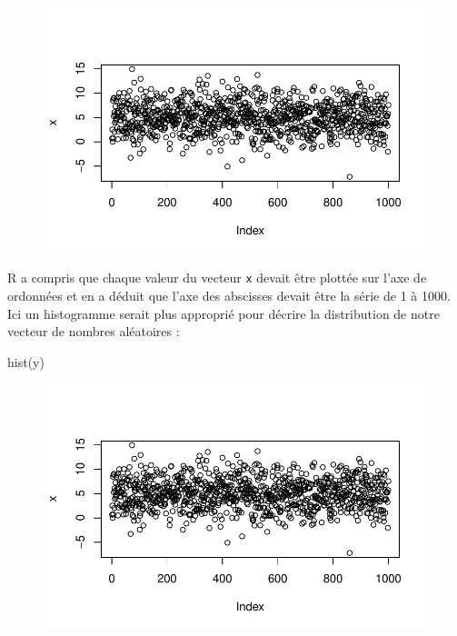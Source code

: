 \documentclass[
  letterpaper,
  DIV=11,
  numbers=noendperiod]{scrreprt}
\newenvironment{Shaded}{\begin{snugshade}}{\end{snugshade}}
\newcommand{\FunctionTok}[1]{\textcolor[rgb]{0.28,0.35,0.67}{#1}}
\newcommand{\NormalTok}[1]{\textcolor[rgb]{0.00,0.23,0.31}{#1}}
\begin{document}
\begin{figure}[H]

{\centering \includegraphics{premiers-pas_files/figure-pdf/unnamed-chunk-59-1.pdf}

}

\end{figure}

R a compris que chaque valeur du vecteur \texttt{x} devait être plottée
sur l'axe de ordonnées et en a déduit que l'axe des abscisses devait
être la série de 1 à 1000. Ici un histogramme serait plus approprié pour
décrire la distribution de notre vecteur de nombres aléatoires :

\begin{Shaded}
\begin{Highlighting}[]
\FunctionTok{hist}\NormalTok{(y)}
\end{Highlighting}
\end{Shaded}

\begin{figure}[H]

{\centering \includegraphics{premiers-pas_files/figure-pdf/unnamed-chunk-60-1.pdf}

}

\end{figure}
\end{document}
